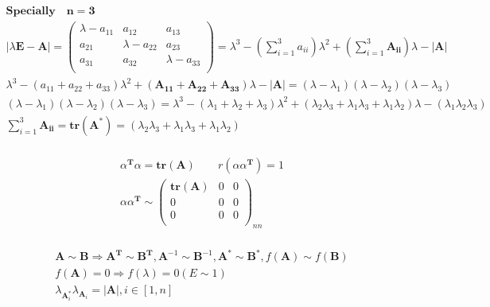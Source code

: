 \documentclass{article}
\begin{document}
\begin{align*}
    \bm{Specially \quad n = 3} \\ 
    |\lambda\mathbf{E}-\mathbf{A}| = \left( 
        \begin{array}{ccc}
            \lambda-a_{11} & a_{12} & a_{13} \\  
            a_{21} & \lambda-a_{22} & a_{23}  \\ 
            a_{31} & a_{32} & \lambda-a_{33} \\ 
        \end{array}  
    \right) = \lambda^{3}-\left(\sum_{i=1}^{3}a_{ii}\right)\lambda^{2}+\left(\sum_{i=1}^{3}\mathbf{A_{ii}}\right)\lambda-|\mathbf{A}|\\
    \lambda^{3}-(a_{11}+a_{22}+a_{33})\lambda^{2}+(\mathbf{A_{11}}+\mathbf{A_{22}}+\mathbf{A_{33}})\lambda-|\mathbf{A}| = (\lambda-\lambda_{1})(\lambda-\lambda_{2})(\lambda-\lambda_{3}) \\ 
    (\lambda-\lambda_{1})(\lambda-\lambda_{2})(\lambda-\lambda_{3}) = \lambda^{3}-(\lambda_{1}+\lambda_{2}+\lambda_{3})\lambda^{2}+(\lambda_{2}\lambda_{3}+\lambda_{1}\lambda_{3}+\lambda_{1}\lambda_{2})\lambda-(\lambda_{1}\lambda_{2}\lambda_{3}) \\ 
    \sum_{i=1}^{3}\mathbf{A_{ii}} = \mathbf{tr}(\mathbf{A}^{*}) = (\lambda_{2}\lambda_{3}+\lambda_{1}\lambda_{3}+\lambda_{1}\lambda_{2})\\ 
\end{align*}

\begin{align*} 
    \alpha^{\mathbf{T}}\alpha = \mathbf{tr(A)} \qquad r(\alpha\alpha^{\mathbf{T}}) = 1 \\ 
    \alpha \alpha^{\mathbf{T}} \sim \left( 
        \begin{array}{ccc} 
            \mathbf{tr(A)} & 0 & 0 \\ 
            0 & 0 & 0 \\ 
            0 & 0 & 0 \\
        \end{array}  
    \right)_{nn} \\ 
\end{align*}

\begin{align*}
    \mathbf{A} \sim \mathbf{B} \Longrightarrow \mathbf{A}^{\mathbf{T}} \sim \mathbf{B}^{\mathbf{T}},\mathbf{A}^{-1} \sim \mathbf{B}^{-1},\mathbf{A}^{\mathbf{*}} \sim \mathbf{B}^{\mathbf{*}},f(\mathbf{A}) \sim f(\mathbf{B}) \\ 
    f(\mathbf{A})=0 \Rightarrow f(\lambda) = 0 (E \sim 1)\\ 
    \lambda_{\mathbf{A}^{*}_{i}} \lambda_{\mathbf{A}_{i}} = |\mathbf{A}|,i \in [1,n]\\ 
\end{align*}
\end{document}
